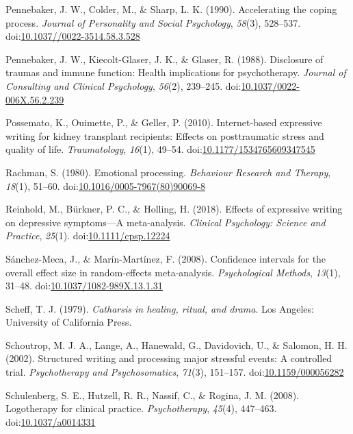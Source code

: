 \documentclass[english,man, mask]{apa6}
\theoremstyle{definition}
\theoremstyle{definition}
\theoremstyle{definition}
\theoremstyle{remark}
\begin{document}
\hypertarget{ref-Pennebaker1990}{}
Pennebaker, J. W., Colder, M., \& Sharp, L. K. (1990). Accelerating the
coping process. \emph{Journal of Personality and Social Psychology},
\emph{58}(3), 528--537.
doi:\href{https://doi.org/10.1037//0022-3514.58.3.528}{10.1037//0022-3514.58.3.528}

\hypertarget{ref-Pennebaker1988}{}
Pennebaker, J. W., Kiecolt-Glaser, J. K., \& Glaser, R. (1988).
Disclosure of traumas and immune function: Health implications for
psychotherapy. \emph{Journal of Consulting and Clinical Psychology},
\emph{56}(2), 239--245.
doi:\href{https://doi.org/10.1037/0022-006X.56.2.239}{10.1037/0022-006X.56.2.239}

\hypertarget{ref-Possemato2010}{}
Possemato, K., Ouimette, P., \& Geller, P. (2010). Internet-based
expressive writing for kidney transplant recipients: Effects on
posttraumatic stress and quality of life. \emph{Traumatology},
\emph{16}(1), 49--54.
doi:\href{https://doi.org/10.1177/1534765609347545}{10.1177/1534765609347545}

\hypertarget{ref-Rachman1980}{}
Rachman, S. (1980). Emotional processing. \emph{Behaviour Research and
Therapy}, \emph{18}(1), 51--60.
doi:\href{https://doi.org/10.1016/0005-7967(80)90069-8}{10.1016/0005-7967(80)90069-8}

\hypertarget{ref-Reinhold2018}{}
Reinhold, M., Bürkner, P. C., \& Holling, H. (2018). Effects of
expressive writing on depressive symptoms---A meta-analysis.
\emph{Clinical Psychology: Science and Practice}, \emph{25}(1).
doi:\href{https://doi.org/10.1111/cpsp.12224}{10.1111/cpsp.12224}

\hypertarget{ref-Sanchez-Meca2008a}{}
Sánchez-Meca, J., \& Marín-Martínez, F. (2008). Confidence intervals for
the overall effect size in random-effects meta-analysis.
\emph{Psychological Methods}, \emph{13}(1), 31--48.
doi:\href{https://doi.org/10.1037/1082-989X.13.1.31}{10.1037/1082-989X.13.1.31}

\hypertarget{ref-Scheff1979}{}
Scheff, T. J. (1979). \emph{Catharsis in healing, ritual, and drama}.
Los Angeles: University of California Press.

\hypertarget{ref-Schoutrop2002}{}
Schoutrop, M. J. A., Lange, A., Hanewald, G., Davidovich, U., \&
Salomon, H. H. (2002). Structured writing and processing major stressful
events: A controlled trial. \emph{Psychotherapy and Psychosomatics},
\emph{71}(3), 151--157.
doi:\href{https://doi.org/10.1159/000056282}{10.1159/000056282}

\hypertarget{ref-Schulenberg2008}{}
Schulenberg, S. E., Hutzell, R. R., Nassif, C., \& Rogina, J. M. (2008).
Logotherapy for clinical practice. \emph{Psychotherapy}, \emph{45}(4),
447--463. doi:\href{https://doi.org/10.1037/a0014331}{10.1037/a0014331}
\end{document}
